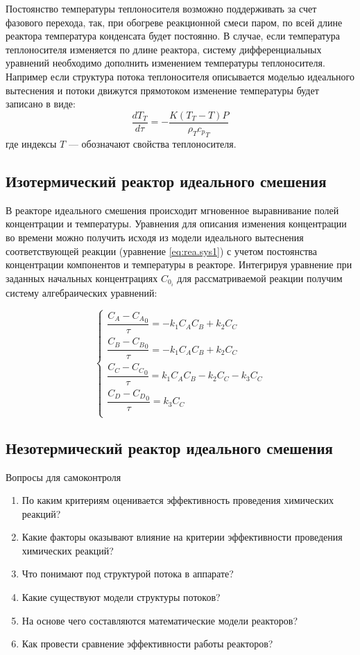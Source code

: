 Постоянство температуры теплоносителя возможно поддерживать за счет фазового перехода, так, при обогреве реакционной смеси паром, по всей длине реактора температура конденсата будет постоянно. В случае, если температура теплоносителя изменяется по длине реактора, систему дифференциальных уравнений необходимо дополнить изменением температуры теплоносителя. Например если структура потока теплоносителя описывается моделью идеального вытеснения и потоки движутся прямотоком изменение температуры будет записано в виде:
\begin{equation}
	\dfrac{d T_T}{d \tau} = -\dfrac{K(T_T-T)P}{\rho_T {c_p}_T}
\end{equation}
где индексы $T$ --- обозначают свойства теплоносителя.


\subsection*{Изотермический реактор идеального смешения}
В реакторе идеального смешения происходит мгновенное выравнивание полей концентрации и температуры. Уравнения для описания изменения концентрации во времени можно получить исходя из модели идеального вытеснения соответствующей реакции (уравнение \eqref{eq:rea.sys1}) с учетом постоянства концентрации компонентов и температуры в реакторе. Интегрируя уравнение при заданных начальных концентрациях  $C_{0_i}$  для рассматриваемой реакции получим систему алгебраических уравнений:

\begin{equation}\label{eq:rea.syssmis}
\left\lbrace 
\begin{gathered} 
\dfrac{C_A - {C_A}_0} {\tau} = -k_1 C_A C_B +k_2 C_C \\
\dfrac{C_B - {C_B}_0} {\tau} = -k_1 C_A C_B +k_2 C_C \\
\dfrac{C_C - {C_C}_0} {\tau} = k_1 C_A C_B -k_2 C_C - k_3 C_C \\
\dfrac{C_D - {C_D}_0} {\tau} = k_3 C_C \\
\end{gathered} 
\right.
\end{equation}

\subsection*{Незотермический реактор идеального смешения}


 
 
Вопросы для самоконтроля
\begin{enumerate}
	\item По каким критериям оценивается эффективность проведения химических реакций?
	\item Какие факторы оказывают влияние на критерии эффективности проведения химических реакций?
	\item Что понимают под структурой потока в аппарате?
	\item Какие существуют модели структуры потоков?
	\item На основе чего составляются математические модели реакторов?
	\item Как провести сравнение эффективности работы реакторов?
\end{enumerate}
